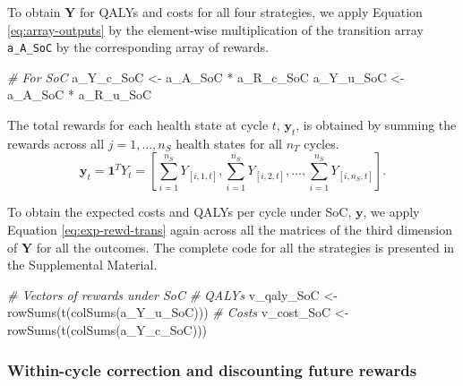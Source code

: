 \documentclass[
]{article}
\newenvironment{Shaded}{\begin{snugshade}}{\end{snugshade}}
\newcommand{\CommentTok}[1]{\textcolor[rgb]{0.56,0.35,0.01}{\textit{#1}}}
\newcommand{\FunctionTok}[1]{\textcolor[rgb]{0.00,0.00,0.00}{#1}}
\newcommand{\NormalTok}[1]{#1}
\newcommand{\OtherTok}[1]{\textcolor[rgb]{0.56,0.35,0.01}{#1}}
\newcommand{\SpecialCharTok}[1]{\textcolor[rgb]{0.00,0.00,0.00}{#1}}
\begin{document}
To obtain \(\mathbf{Y}\) for QALYs and costs for all four strategies, we apply Equation \eqref{eq:array-outputs} by the element-wise multiplication of the transition array \texttt{a\_A\_SoC} by the corresponding array of rewards.

\begin{Shaded}
\begin{Highlighting}[]
\CommentTok{\# For SoC}
\NormalTok{a\_Y\_c\_SoC }\OtherTok{\textless{}{-}}\NormalTok{ a\_A\_SoC }\SpecialCharTok{*}\NormalTok{ a\_R\_c\_SoC}
\NormalTok{a\_Y\_u\_SoC }\OtherTok{\textless{}{-}}\NormalTok{ a\_A\_SoC }\SpecialCharTok{*}\NormalTok{ a\_R\_u\_SoC}
\end{Highlighting}
\end{Shaded}

The total rewards for each health state at cycle \(t\), \(\mathbf{y}_t\), is obtained by summing the rewards across all \(j = 1,\ldots, n_S\) health states for all \(n_T\) cycles.
\begin{equation}
  \mathbf{y}_t = \mathbf{1}^T Y_t = \left[\sum_{i=1}^{n_S}{Y_{[i,1,t]}}, \sum_{i=1}^{n_S}{Y_{[i,2,t]}}, \dots , \sum_{i=1}^{n_S}{Y_{[i,n_S,t]}}\right].
  \label{eq:exp-rewd-trans}
\end{equation}

To obtain the expected costs and QALYs per cycle under SoC, \(\mathbf{y}\), we apply Equation \eqref{eq:exp-rewd-trans} again across all the matrices of the third dimension of \(\mathbf{Y}\) for all the outcomes. The complete code for all the strategies is presented in the Supplemental Material.

\begin{Shaded}
\begin{Highlighting}[]
\CommentTok{\# Vectors of rewards under SoC}
\CommentTok{\# QALYs}
\NormalTok{v\_qaly\_SoC }\OtherTok{\textless{}{-}} \FunctionTok{rowSums}\NormalTok{(}\FunctionTok{t}\NormalTok{(}\FunctionTok{colSums}\NormalTok{(a\_Y\_u\_SoC)))}
\CommentTok{\# Costs}
\NormalTok{v\_cost\_SoC }\OtherTok{\textless{}{-}} \FunctionTok{rowSums}\NormalTok{(}\FunctionTok{t}\NormalTok{(}\FunctionTok{colSums}\NormalTok{(a\_Y\_c\_SoC)))}
\end{Highlighting}
\end{Shaded}

\hypertarget{within-cycle-correction-and-discounting-future-rewards}{%
\subsubsection{Within-cycle correction and discounting future rewards}\label{within-cycle-correction-and-discounting-future-rewards}}
\end{document}
